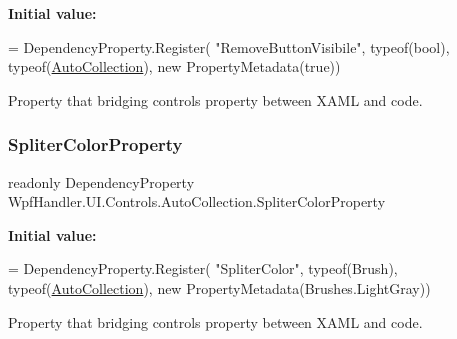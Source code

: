 {\bfseries Initial value\+:}
\begin{DoxyCode}
= DependencyProperty.Register(
          \textcolor{stringliteral}{"RemoveButtonVisibile"}, typeof(\textcolor{keywordtype}{bool}), typeof(\mbox{\hyperlink{class_wpf_handler_1_1_u_i_1_1_controls_1_1_auto_collection_a8bc71a7c43dfeca1d6ff113b12088c28}{AutoCollection}}),
          \textcolor{keyword}{new} PropertyMetadata(\textcolor{keyword}{true}))
\end{DoxyCode}


Property that bridging control\textquotesingle{}s property between X\+A\+ML and code. 

\mbox{\label{class_wpf_handler_1_1_u_i_1_1_controls_1_1_auto_collection_a0d827839ba40e106ecbe9470a7e4c53b}} 
\subsubsection{\texorpdfstring{Spliter\+Color\+Property}{SpliterColorProperty}}
{\footnotesize\ttfamily readonly Dependency\+Property Wpf\+Handler.\+U\+I.\+Controls.\+Auto\+Collection.\+Spliter\+Color\+Property\hspace{0.3cm}{\ttfamily [static]}}

{\bfseries Initial value\+:}
\begin{DoxyCode}
= DependencyProperty.Register(
          \textcolor{stringliteral}{"SpliterColor"}, typeof(Brush), typeof(\mbox{\hyperlink{class_wpf_handler_1_1_u_i_1_1_controls_1_1_auto_collection_a8bc71a7c43dfeca1d6ff113b12088c28}{AutoCollection}}),
          \textcolor{keyword}{new} PropertyMetadata(Brushes.LightGray))
\end{DoxyCode}


Property that bridging control\textquotesingle{}s property between X\+A\+ML and code. 

\mbox{\label{class_wpf_handler_1_1_u_i_1_1_controls_1_1_auto_collection_a142911c55327f71205f61bf4f32f2e35}} 
